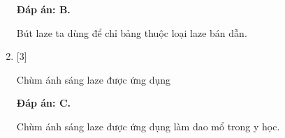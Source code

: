 \begin{enumerate}[label=\bfseries Câu \arabic*:]
	\loigiai
	{		\textbf{Đáp án: B.}
		
		Bút laze ta dùng để chỉ bảng thuộc loại laze bán dẫn.
		
	}
		\item {} [3]
	\cauhoi
	{Chùm ánh sáng laze được ứng dụng
	}
	
	\loigiai
	{		\textbf{Đáp án: C.}
		
		Chùm ánh sáng laze được ứng dụng làm dao mổ trong y học. 
	}
	
\end{enumerate}

